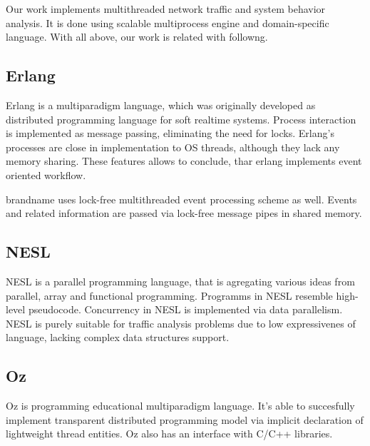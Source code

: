 

Our work implements multithreaded network traffic and system behavior analysis. It is done using scalable multiprocess engine and domain-specific language. With all above, our work is related with followng.

\subsection{Erlang}
Erlang is a multiparadigm language, which was originally developed as distributed programming language for soft realtime systems. Process interaction is implemented as message passing, eliminating the need for locks. Erlang's processes are close in implementation to OS threads, although they lack any memory sharing. These features allows to conclude, thar erlang implements event oriented workflow.

brandname uses lock-free multithreaded event processing scheme as well. Events and related information are passed via lock-free message pipes in shared memory.

\subsection{NESL}

NESL is a parallel programming language, that is agregating various ideas from parallel, array and functional programming. Programms in NESL resemble high-level pseudocode. Concurrency in NESL is implemented via data parallelism. NESL is purely suitable for traffic analysis problems due to low expressivenes of language, lacking complex data structures support.


\subsection{Oz}

Oz is programming educational multiparadigm language. It's able to succesfully implement transparent distributed programming model via implicit declaration of lightweight thread entities. Oz also has an interface with C/C++ libraries. 

